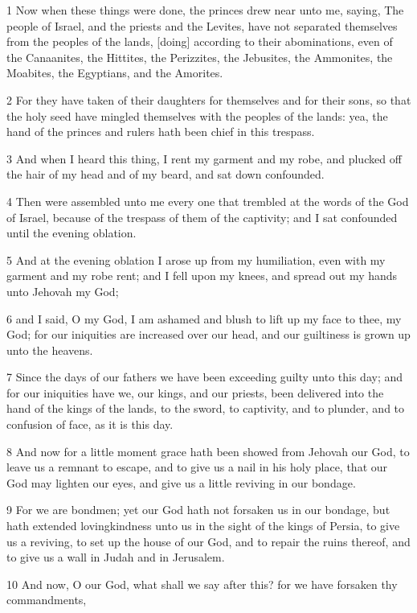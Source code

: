 \par 1 Now when these things were done, the princes drew near unto me, saying, The people of Israel, and the priests and the Levites, have not separated themselves from the peoples of the lands, [doing] according to their abominations, even of the Canaanites, the Hittites, the Perizzites, the Jebusites, the Ammonites, the Moabites, the Egyptians, and the Amorites.
\par 2 For they have taken of their daughters for themselves and for their sons, so that the holy seed have mingled themselves with the peoples of the lands: yea, the hand of the princes and rulers hath been chief in this trespass.
\par 3 And when I heard this thing, I rent my garment and my robe, and plucked off the hair of my head and of my beard, and sat down confounded.
\par 4 Then were assembled unto me every one that trembled at the words of the God of Israel, because of the trespass of them of the captivity; and I sat confounded until the evening oblation.
\par 5 And at the evening oblation I arose up from my humiliation, even with my garment and my robe rent; and I fell upon my knees, and spread out my hands unto Jehovah my God;
\par 6 and I said, O my God, I am ashamed and blush to lift up my face to thee, my God; for our iniquities are increased over our head, and our guiltiness is grown up unto the heavens.
\par 7 Since the days of our fathers we have been exceeding guilty unto this day; and for our iniquities have we, our kings, and our priests, been delivered into the hand of the kings of the lands, to the sword, to captivity, and to plunder, and to confusion of face, as it is this day.
\par 8 And now for a little moment grace hath been showed from Jehovah our God, to leave us a remnant to escape, and to give us a nail in his holy place, that our God may lighten our eyes, and give us a little reviving in our bondage.
\par 9 For we are bondmen; yet our God hath not forsaken us in our bondage, but hath extended lovingkindness unto us in the sight of the kings of Persia, to give us a reviving, to set up the house of our God, and to repair the ruins thereof, and to give us a wall in Judah and in Jerusalem.
\par 10 And now, O our God, what shall we say after this? for we have forsaken thy commandments,

